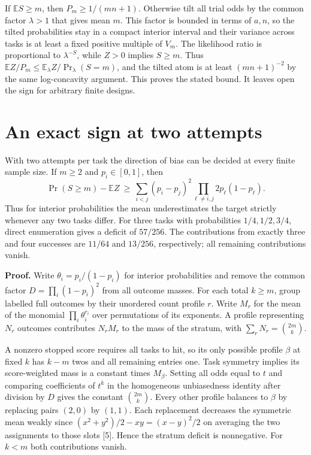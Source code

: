 \documentclass[11pt]{article}
\begin{document}
If $\mathbb ES\ge m$, then $P_m\ge1/(mn+1)$. Otherwise tilt all trial odds by the common factor $\lambda>1$ that gives mean $m$. This factor is bounded in terms of $a,n$, so the tilted probabilities stay in a compact interior interval and their variance across tasks is at least a fixed positive multiple of $V_m$. The likelihood ratio is proportional to $\lambda^{-S}$, while $Z>0$ implies $S\ge m$. Thus $\mathbb EZ/P_m\le\mathbb E_\lambda Z/\Pr_\lambda(S=m)$, and the tilted atom is at least $(mn+1)^{-2}$ by the same log-concavity argument. This proves the stated bound. It leaves open the sign for arbitrary finite designs.

\newpage
\section*{An exact sign at two attempts}

With two attempts per task the direction of bias can be decided at every finite sample size. If $m\ge2$ and $p_i\in[0,1]$, then
\[
\Pr(S\ge m)-\mathbb EZ \ \ge\
\sum_{i<j}(p_i-p_j)^2\prod_{\ell\ne i,j}2p_\ell(1-p_\ell).
\]
Thus for interior probabilities the mean underestimates the target strictly whenever any two tasks differ. For three tasks with probabilities $1/4,1/2,3/4$, direct enumeration gives a deficit of $57/256$. The contributions from exactly three and four successes are $11/64$ and $13/256$, respectively; all remaining contributions vanish.

\textbf{Proof.} Write $\theta_i=p_i/(1-p_i)$ for interior probabilities and remove the common factor $D=\prod_i(1-p_i)^2$ from all outcome masses. For each total $k\ge m$, group labelled full outcomes by their unordered count profile $r$. Write $M_r$ for the mean of the monomial $\prod_i\theta_i^{r_i}$ over permutations of its exponents. A profile representing $N_r$ outcomes contributes $N_r M_r$ to the mass of the stratum, with $\sum_r N_r=\binom{2m}{k}$.

A nonzero stopped score requires all tasks to hit, so its only possible profile $\beta$ at fixed $k$ has $k-m$ twos and all remaining entries one. Task symmetry implies its score-weighted mass is a constant times $M_\beta$. Setting all odds equal to $t$ and comparing coefficients of $t^k$ in the homogeneous unbiasedness identity after division by $D$ gives the constant $\binom{2m}{k}$. Every other profile balances to $\beta$ by replacing pairs $(2,0)$ by $(1,1)$. Each replacement decreases the symmetric mean weakly since $(x^2+y^2)/2-xy=(x-y)^2/2$ on averaging the two assignments to those slots [5]. Hence the stratum deficit is nonnegative. For $k<m$ both contributions vanish.
\end{document}
